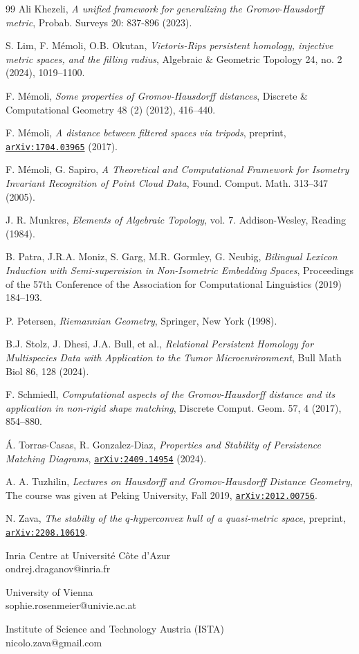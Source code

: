 \documentclass[8pt,a4paper,oneside,english,english]{article}
\theoremstyle{plain}
\theoremstyle
{plain}
\theoremstyle{definition}
\begin{document}
\begin{thebibliography}{99}
Ali Khezeli, {\em A unified framework for generalizing the Gromov-Hausdorff metric}, Probab. Surveys 20: 837-896 (2023).

S. Lim, F. M\'emoli, O.B. Okutan, {\em Vietoris-Rips persistent homology, injective metric
spaces, and the filling radius}, Algebraic \& Geometric Topology 24, no. 2 (2024), 1019--1100.

F. M\'emoli, {\em Some properties of Gromov-Hausdorff distances}, Discrete \& Computational Geometry 48 (2) (2012), 416--440.

F. M\'emoli, {\em A distance between filtered spaces via tripods}, preprint, \href{https://arxiv.org/abs/1704.03965}{\tt arXiv:1704.03965} (2017). 

F. M\'emoli, G. Sapiro, {\em A Theoretical and Computational Framework for Isometry Invariant Recognition of Point Cloud Data}, Found. Comput. Math. 313--347 (2005).

J. R. Munkres, {\em Elements of Algebraic Topology}, vol. 7. Addison-Wesley, Reading (1984).

B. Patra, J.R.A. Moniz, S. Garg, M.R. Gormley, G. Neubig, {\em Bilingual Lexicon Induction with Semi-supervision in Non-Isometric Embedding Spaces}, Proceedings of the 57th Conference of the Association for Computational Linguistics (2019) 184--193.

P. Petersen, {\em Riemannian Geometry}, Springer, New York (1998).

B.J. Stolz, J. Dhesi, J.A. Bull, et al., {\em Relational Persistent Homology for Multispecies Data with Application to the Tumor Microenvironment}, Bull Math Biol 86, 128 (2024).

F. Schmiedl, {\em Computational aspects of the Gromov-Hausdorff distance and its application in non-rigid shape matching}, Discrete Comput. Geom. 57, 4 (2017), 854--880.

\'A. Torras-Casas, R. Gonzalez-Diaz, {\em Properties and Stability of Persistence Matching Diagrams}, \href{https://arxiv.org/abs/2409.14954}{\tt arXiv:2409.14954} (2024).

A. A. Tuzhilin, {\em Lectures on Hausdorff and Gromov-Hausdorff Distance Geometry}, The course was given at Peking University, Fall 2019, \href{https://arxiv.org/abs/2012.00756}{\tt arXiv:2012.00756}.

N. Zava, {\em The stabilty of the $q$-hyperconvex hull of a quasi-metric space}, preprint, \href{https://arxiv.org/abs/2208.10619}{\tt arXiv:2208.10619}. 

\end{thebibliography}

\bigskip

\noindent Inria Centre at Universit\'{e} C\^{o}te d'Azur\\
ondrej.draganov@inria.fr

\smallskip 

\noindent University of Vienna\\
sophie.rosenmeier@univie.ac.at

\smallskip

\noindent Institute of Science and Technology Austria (ISTA)\\
nicolo.zava@gmail.com 
\end{document}
